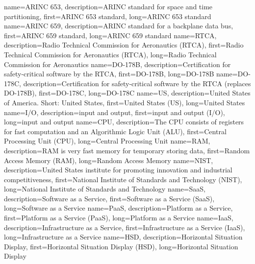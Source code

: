 {%
    name={ARINC 653},
    description={ARINC standard for space and time partitioning},
    first={ARINC 653 standard},
    long={ARINC 653 standard}
}
{%
    name={ARINC 659},
    description={ARINC standard for a backplane data bus},
    first={ARINC 659 standard},
    long={ARINC 659 standard}
}
{%
    name={RTCA},
    description={Radio Technical Commission for Aeronautics (RTCA)},
    first={Radio Technical Commission for Aeronautics (RTCA)},
    long={Radio Technical Commission for Aeronautics}
}
{%
    name={DO-178B},
    description={Certification for safety-critical software by the RTCA},
    first={DO-178B},
    long={DO-178B}
}
{%
    name={DO-178C},
    description={Certification for safety-critical software by the RTCA (replaces DO-178B)},
    first={DO-178C},
    long={DO-178C}
}
{%
    name={US},
    description={United States of America. Short: United States},
    first={United States (US)},
    long={United States}
}
{%
    name={I/O},
    description={input and output},
    first={input and output (I/O)},
    long={input and output}
}
{%
    name={CPU},
    description={The CPU consists of registers for fast computation and an Algorithmic Logic Unit (ALU)},
    first={Central Processing Unit (CPU)},
    long={Central Processing Unit}
}
{%
    name={RAM},
    description={RAM is very fast memory for temporary storing data},
    first={Random Access Memory (RAM)},
    long={Random Access Memory}
}
{%
    name={NIST},
    description={United States institute for promoting innovation and industrial competitiveness},
    first={National Institute of Standards and Technology (NIST)},
    long={National Institute of Standards and Technology}
}
{%
    name={SaaS},
    description={Software as a Service},
    first={Software as a Service (SaaS)},
    long={Software as a Service}
}
{%
    name={PaaS},
    description={Platform as a Service},
    first={Platform as a Service (PaaS)},
    long={Platform as a Service}
}
{%
    name={IaaS},
    description={Infrastructure as a Service},
    first={Infrastructure as a Service (IaaS)},
    long={Infrastructure as a Service}
}
{%
    name={HSD},
    description={Horizontal Situation Display},
    first={Horizontal Situation Display (HSD)},
    long={Horizontal Situation Display}
}
